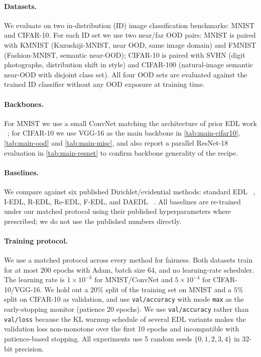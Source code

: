\documentclass[review,5p,times]{elsarticle}
\begin{document}
\paragraph{Datasets.}
We evaluate on two in-distribution (ID) image classification benchmarks:
MNIST and CIFAR-10. For each ID set we use two near/far OOD pairs:
MNIST is paired with KMNIST (Kuzushiji-MNIST, near OOD, same image domain)
and FMNIST (Fashion-MNIST, semantic near-OOD); CIFAR-10 is paired with
SVHN (digit photographs, distribution shift in style) and CIFAR-100
(natural-image semantic near-OOD with disjoint class set). All four OOD sets
are evaluated against the trained ID classifier without any OOD exposure at
training time.

\paragraph{Backbones.}
For MNIST we use a small ConvNet matching the architecture of prior EDL work
~\citep{sensoy2018edl}; for CIFAR-10 we use VGG-16 as the main backbone in
\autoref{tab:main-cifar10}, \autoref{tab:main-ood} and
\autoref{tab:main-misc}, and also report a parallel ResNet-18 evaluation
in \autoref{tab:main-resnet} to confirm backbone generality of the
recipe.

\paragraph{Baselines.}
We compare against six published Dirichlet/evidential methods: standard EDL
~\citep{sensoy2018edl}, I-EDL, R-EDL, Re-EDL, F-EDL, and DAEDL
~\citep{yoon2024daedl}. All baselines are re-trained under our matched
protocol using their published hyperparameters where prescribed; we do not
use the published numbers directly.

\paragraph{Training protocol.}
We use a matched protocol across every method for fairness. Both datasets
train for at most 200 epochs with Adam, batch size 64, and no learning-rate
scheduler. The learning rate is $1\!\times\!10^{-3}$ for MNIST/ConvNet and
$5\!\times\!10^{-4}$ for CIFAR-10/VGG-16. We hold out a $20\%$ split of the
training set on MNIST and a $5\%$ split on CIFAR-10 as validation, and use
\texttt{val/accuracy} with mode \texttt{max} as the early-stopping monitor
(patience 20 epochs). We use \texttt{val/accuracy} rather than
\texttt{val/loss} because the KL warmup schedule of several EDL variants
makes the validation loss non-monotone over the first 10 epochs and
incompatible with patience-based stopping. All experiments use 5 random
seeds $\{0,1,2,3,4\}$ in 32-bit precision.
\end{document}
